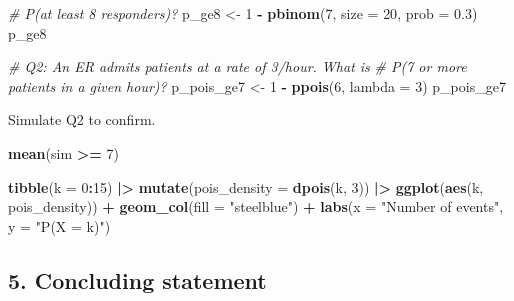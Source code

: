 \documentclass[
]{article}
\newenvironment{Shaded}{\begin{snugshade}}{\end{snugshade}}
\newcommand{\AttributeTok}[1]{\textcolor[rgb]{0.13,0.29,0.53}{#1}}
\newcommand{\CommentTok}[1]{\textcolor[rgb]{0.56,0.35,0.01}{\textit{#1}}}
\newcommand{\DecValTok}[1]{\textcolor[rgb]{0.00,0.00,0.81}{#1}}
\newcommand{\FloatTok}[1]{\textcolor[rgb]{0.00,0.00,0.81}{#1}}
\newcommand{\FunctionTok}[1]{\textcolor[rgb]{0.13,0.29,0.53}{\textbf{#1}}}
\newcommand{\NormalTok}[1]{#1}
\newcommand{\OtherTok}[1]{\textcolor[rgb]{0.56,0.35,0.01}{#1}}
\newcommand{\SpecialCharTok}[1]{\textcolor[rgb]{0.81,0.36,0.00}{\textbf{#1}}}
\newcommand{\StringTok}[1]{\textcolor[rgb]{0.31,0.60,0.02}{#1}}
\begin{document}
\begin{Shaded}
\begin{Highlighting}[]
\CommentTok{\# P(at least 8 responders)?}
\NormalTok{p\_ge8 }\OtherTok{\textless{}{-}} \DecValTok{1} \SpecialCharTok{{-}} \FunctionTok{pbinom}\NormalTok{(}\DecValTok{7}\NormalTok{, }\AttributeTok{size =} \DecValTok{20}\NormalTok{, }\AttributeTok{prob =} \FloatTok{0.3}\NormalTok{)}
\NormalTok{p\_ge8}

\CommentTok{\# Q2: An ER admits patients at a rate of 3/hour. What is}
\CommentTok{\# P(7 or more patients in a given hour)?}
\NormalTok{p\_pois\_ge7 }\OtherTok{\textless{}{-}} \DecValTok{1} \SpecialCharTok{{-}} \FunctionTok{ppois}\NormalTok{(}\DecValTok{6}\NormalTok{, }\AttributeTok{lambda =} \DecValTok{3}\NormalTok{)}
\NormalTok{p\_pois\_ge7}
\end{Highlighting}
\end{Shaded}

Simulate Q2 to confirm.

\begin{Shaded}
\begin{Highlighting}[]
\FunctionTok{mean}\NormalTok{(sim }\SpecialCharTok{\textgreater{}=} \DecValTok{7}\NormalTok{)}
\end{Highlighting}
\end{Shaded}

\begin{Shaded}
\begin{Highlighting}[]
\FunctionTok{tibble}\NormalTok{(}\AttributeTok{k =} \DecValTok{0}\SpecialCharTok{:}\DecValTok{15}\NormalTok{) }\SpecialCharTok{|\textgreater{}}
  \FunctionTok{mutate}\NormalTok{(}\AttributeTok{pois\_density =} \FunctionTok{dpois}\NormalTok{(k, }\DecValTok{3}\NormalTok{)) }\SpecialCharTok{|\textgreater{}}
  \FunctionTok{ggplot}\NormalTok{(}\FunctionTok{aes}\NormalTok{(k, pois\_density)) }\SpecialCharTok{+}
  \FunctionTok{geom\_col}\NormalTok{(}\AttributeTok{fill =} \StringTok{"steelblue"}\NormalTok{) }\SpecialCharTok{+}
  \FunctionTok{labs}\NormalTok{(}\AttributeTok{x =} \StringTok{"Number of events"}\NormalTok{, }\AttributeTok{y =} \StringTok{"P(X = k)"}\NormalTok{)}
\end{Highlighting}
\end{Shaded}

\subsection{5. Concluding statement}\label{concluding-statement}
\end{document}
